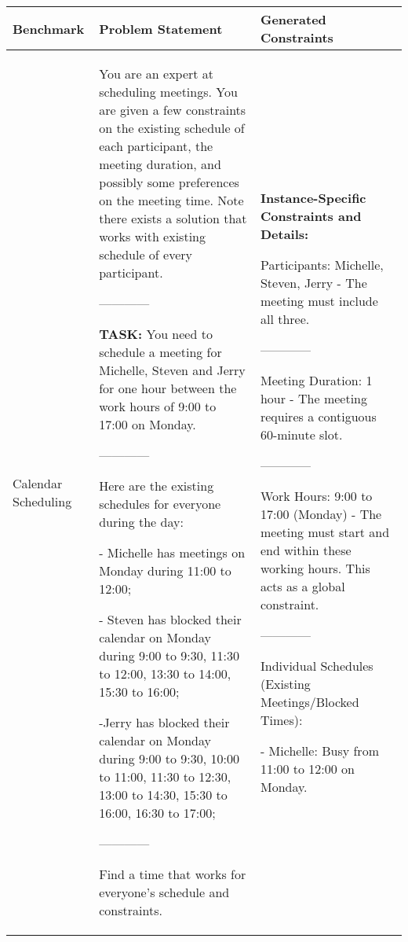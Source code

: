 \begin{table*}
\centering
\scriptsize
\renewcommand{\arraystretch}{1.2} %

\begin{tabularx}{\textwidth}{>{\raggedright}p{}|X|X}
\toprule
\textbf{Benchmark}   & \textbf{Problem Statement}  & \textbf{Generated Constraints} \\ \midrule

Calendar Scheduling & You are an expert at scheduling meetings. You are given a few constraints on the existing schedule of each participant, the meeting duration, and possibly some preferences on the meeting time. Note there exists a solution that works with existing schedule of every participant.

------------

\textbf{TASK:} You need to schedule a meeting for Michelle, Steven and Jerry for one hour between the work hours of 9:00 to 17:00 on Monday.

------------

Here are the existing schedules for everyone during the day:

- Michelle has meetings on Monday during 11:00 to 12:00;

- Steven has blocked their calendar on Monday during 9:00 to 9:30, 11:30 to 12:00, 13:30 to 14:00, 15:30 to 16:00;

 -Jerry has blocked their calendar on Monday during 9:00 to 9:30, 10:00 to 11:00, 11:30 to 12:30, 13:00 to 14:30, 15:30 to 16:00, 16:30 to 17:00;

------------

Find a time that works for everyone's schedule and constraints.

& 

\textbf{Instance-Specific Constraints and Details:}

Participants: Michelle, Steven, Jerry - The meeting must include all three.

------------

Meeting Duration: 1 hour - The meeting requires a contiguous 60-minute slot.

------------

Work Hours: 9:00 to 17:00 (Monday) -  The meeting must start and end within these working hours.  This acts as a global constraint.

------------

Individual Schedules (Existing Meetings/Blocked Times):

- Michelle: Busy from 11:00 to 12:00 on Monday.
    

\end{tabularx}
\end{table*}
